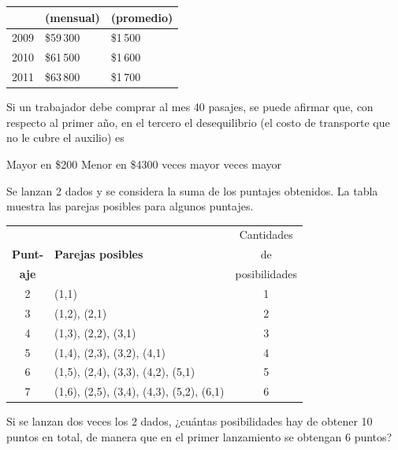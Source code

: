 \documentclass[10pt,letterpaper,addpoints]{exam}
\begin{document}
\begin{multicols}{2}
\begin{questions}
\begin{center}
\begin{tabular}{|c|p{3cm}|p{3cm}|}
 & (mensual) & (promedio) \\ 
\hline 
2009 & \$59\,300 & \$1\,500 \\ 
\hline 
2010 & \$61\,500 & \$1\,600 \\ 
\hline 
2011 & \$63\,800 & \$1\,700 \\ 
\hline 
\end{tabular} 
\end{center}
Si un trabajador debe comprar al mes 40 pasajes, se puede afirmar que, con respecto al primer año, en el tercero el desequilibrio (el costo de transporte que no le cubre el auxilio) es
\begin{choices}
\begin{multicols}{2}
\choice Mayor en \$200
\choice Menor en \$4300
 veces mayor
 veces mayor
\end{multicols}
\end{choices}
\question Se lanzan 2 dados y se considera la suma de los puntajes obtenidos. La tabla muestra las parejas posibles para algunos puntajes.
\begin{center}
\begin{tabular}{|c|p{4cm}|c|}
\hline 
 &  & Cantidades\\
\textbf{Punt-} & \textbf{Parejas posibles} & de \\ 
\textbf{aje} &  & posibilidades \\ 
\hline 
2 & (1,1) & 1 \\ 
\hline 
3 & (1,2), (2,1) & 2 \\ 
\hline 
4 & (1,3), (2,2), (3,1) & 3 \\ 
\hline 
5 & (1,4), (2,3), (3,2), (4,1) & 4 \\ 
\hline 
6 & (1,5), (2,4), (3,3), (4,2), (5,1) & 5 \\ 
\hline 
7 & (1,6), (2,5), (3,4), (4,3), (5,2), (6,1) & 6 \\ 
\hline 
\end{tabular} 
\end{center}
Si se lanzan dos veces los 2 dados, ¿cuántas posibilidades hay de obtener 10 puntos en total, de manera que en el primer lanzamiento se obtengan 6 puntos?


\end{questions}
\end{multicols}
\end{document}
